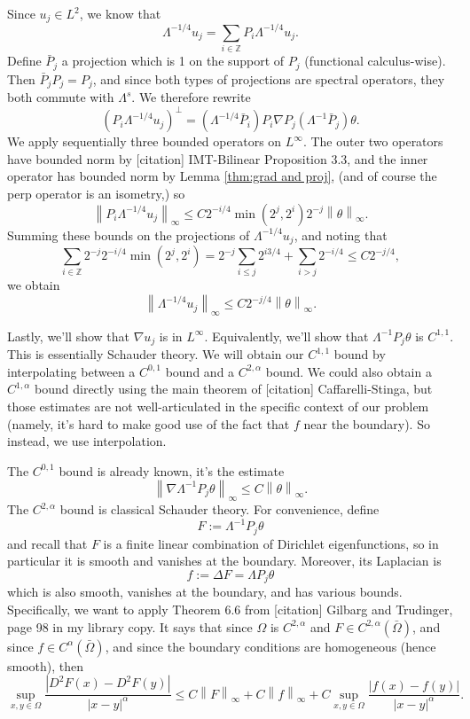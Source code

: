 \documentclass[11pt]{amsart}
\theoremstyle{remark}
\theoremstyle{definition}
\newcommand{\Z}{\mathbb{Z}}
\newcommand{\norm}[1]{\left\lVert#1\right\rVert}
\newcommand{\paren}[1]{\left( #1 \right)}
\newcommand{\abs}[1]{\left\lvert #1 \right\rvert}
\newcommand{\grad}{\nabla}
\newcommand{\Laplace}{\Delta}
\begin{document}
Since $u_j \in L^2$, we know that
\[ \Lambda^{-1/4} u_j = \sum_{i \in \Z} P_i \Lambda^{-1/4} u_j. \]
Define $\bar{P}_j$ a projection which is 1 on the support of $P_j$ (functional calculus-wise).  Then $\bar{P}_j P_j = P_j$, and since both types of projections are spectral operators, they both commute with $\Lambda^s$.  We therefore rewrite
\[ \paren{P_i \Lambda^{-1/4} u_j}^\perp = \paren{\Lambda^{-1/4} \bar{P}_i} P_i \grad P_j \paren{\Lambda^{-1} \bar{P}_j} \theta. \]
We apply sequentially three bounded operators on $L^\infty$.  The outer two operators have bounded norm by [citation] IMT-Bilinear Proposition 3.3, and the inner operator has bounded norm by Lemma \ref{thm:grad and proj}, (and of course the perp operator is an isometry,) so 
\[ \norm{ P_i \Lambda^{-1/4} u_j}_\infty \leq C 2^{-i/4} \min(2^j, 2^i) 2^{-j} \norm{\theta}_\infty. \]
%
Summing these bounds on the projections of $\Lambda^{-1/4} u_j$, and noting that
\[ \sum_{i \in \Z} 2^{-j} 2^{-i/4} \min(2^j,2^i) = 2^{-j} \sum_{i \leq j} 2^{i 3/4} + \sum_{i>j} 2^{-i/4} \leq C 2^{-j/4}, \]
we obtain
\[ \norm{\Lambda^{-1/4} u_j}_\infty \leq C 2^{-j/4} \norm{\theta}_\infty. \]

Lastly, we'll show that $\grad u_j$ is in $L^\infty$.  Equivalently, we'll show that $\Lambda^{-1} P_j \theta$ is $C^{1,1}$.  This is essentially Schauder theory.  We will obtain our $C^{1,1}$ bound by interpolating between a $C^{0,1}$ bound and a $C^{2,\alpha}$ bound.  We could also obtain a $C^{1,\alpha}$ bound directly using the main theorem of [citation] Caffarelli-Stinga, but those estimates are not well-articulated in the specific context of our problem (namely, it's hard to make good use of the fact that $f$ near the boundary).  So instead, we use interpolation.  

The $C^{0,1}$ bound is already known, it's the estimate
\[ \norm{\grad \Lambda^{-1} P_j \theta}_\infty \leq C \norm{\theta}_\infty. \]
The $C^{2,\alpha}$ bound is classical Schauder theory.  For convenience, define 
\[ F := \Lambda^{-1} P_j \theta \]
and recall that $F$ is a finite linear combination of Dirichlet eigenfunctions, so in particular it is smooth and vanishes at the boundary.  Moreover, its Laplacian is 
\[ f := \Laplace F = \Lambda P_j \theta \]
which is also smooth, vanishes at the boundary, and has various bounds.  Specifically, we want to apply Theorem 6.6 from [citation] Gilbarg and Trudinger, page 98 in my library copy.  It says that since $\Omega$ is $C^{2,\alpha}$ and $F \in C^{2,\alpha}(\bar{\Omega})$, and since $f \in C^\alpha(\bar{\Omega})$, and since the boundary conditions are homogeneous (hence smooth), then
\[ \sup_{x,y \in \Omega} \frac{\abs{D^2 F(x)- D^2 F(y)}}{|x-y|^\alpha} \leq C \norm{F}_\infty + C \norm{f}_\infty + C \sup_{x,y\in\Omega} \frac{\abs{f(x)-f(y)}}{|x-y|^\alpha}. \]
\end{document}
